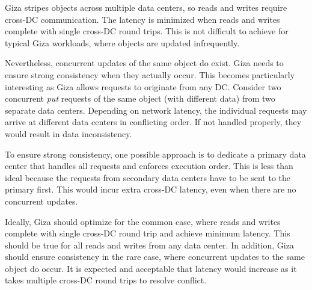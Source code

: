Giza stripes objects across multiple data centers, so reads and writes require cross-DC communication. The latency is minimized when reads and writes complete with single cross-DC round trips. This is not difficult to achieve for typical Giza workloads, where objects are updated infrequently.

Nevertheless, concurrent updates of the same object do exist. Giza needs to ensure strong consistency when they actually occur. This becomes particularly interesting as Giza allows requests to originate from any DC. Consider two concurrent {\em put} requests of the same object (with different data) from two separate data centers. Depending on network latency, the individual requests may arrive at different data centers in conflicting order. If not handled properly, they would result in data inconsistency. 

To ensure strong consistency, one possible approach is to dedicate a primary data center that handles all requests and enforces execution order. This is less than ideal because the requests from secondary data centers have to be sent to the primary first. This would incur extra cross-DC latency, even when there are no concurrent updates.

Ideally, Giza should optimize for the common case, where reads and writes complete with single cross-DC round trip and achieve minimum latency. This should be true for all reads and writes from any data center. In addition, Giza should ensure consistency in the rare case, where concurrent updates to the same object do occur. It is expected and acceptable that latency would increase as it takes multiple cross-DC round trips to resolve conflict.


